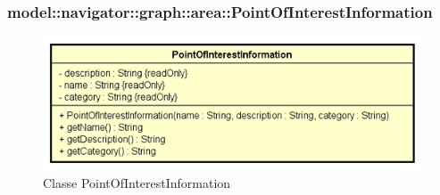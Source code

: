 \documentclass[../DefinizioneDiProdotto.tex]{subfiles}
\begin{document}
\subsubsection{model::navigator::graph::area::PointOfInterestInformation}

    \begin{figure}[H]
        \centering
        \includegraphics{img/PointOfInterestInformation.png}
        \caption{Classe PointOfInterestInformation}\label{fig:model::navigator::graph::area::PointOfInterestInformation} 
    \end{figure}
\end{document}
